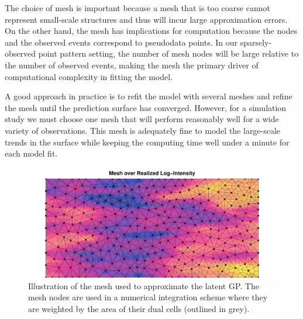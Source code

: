 \documentclass[review]{elsarticle}
\begin{document}
The choice of mesh is important because a mesh that is too coarse cannot
represent small-scale structures and thus will incur large approximation
errors. On the other hand, the mesh has implications for computation because
the nodes and the observed events correspond to pseudodata points. In our
sparsely-observed point pattern setting, the number of mesh nodes will be
large relative to the number of observed events, making the mesh the primary
driver of computational complexity in fitting the model.

A good approach in practice is to refit the model with several meshes and
refine the mesh until the prediction surface has converged. However, for a
simulation study we must choose one mesh that will perform reasonably well for
a wide variety of observations. This mesh is adequately fine to model
the large-scale trends in the surface while keeping the computing time well
under a minute for each model fit.

\begin{figure}
\includegraphics[width=5in]{../graphics/mesh-LGCP000004.pdf}
\caption{Illustration of the mesh used to approximate the latent GP. The mesh
nodes are used in a numerical integration scheme where they are weighted by the
area of their dual cells (outlined in grey).}
\label{meshfull}
\end{figure}


\end{document}
